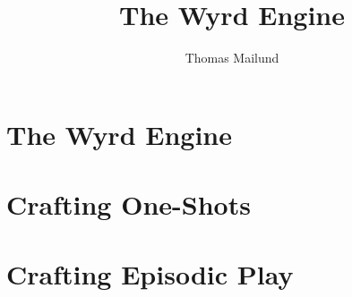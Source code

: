 \documentclass[twocolumn,nodeprecatedcode,bg=print]{dndbook/dndbook}
\title{The Wyrd Engine}
\author{Thomas Mailund}
\begin{document}
\DndSetThemeColor[DmgSlateGray]

\frontmatter
\maketitle
\tableofcontents

\mainmatter%




\part{The Wyrd Engine}





\part{Crafting One-Shots}


\part{Crafting Episodic Play}




\printindex
\end{document}
